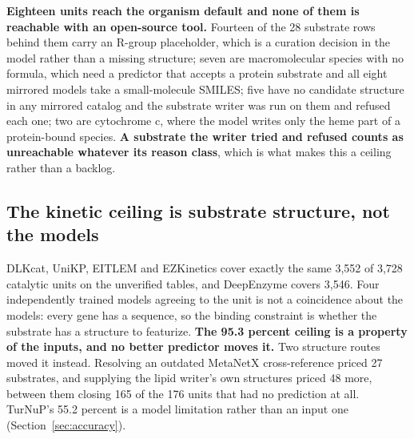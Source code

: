 

\textbf{Eighteen units reach the organism default and none of them is reachable with an
open-source tool.} Fourteen of the 28 substrate rows behind them carry an R-group
placeholder, which is a curation decision in the model rather than a missing structure;
seven are macromolecular species with no formula, which need a predictor that accepts a
protein substrate and all eight mirrored models take a small-molecule SMILES; five have no
candidate structure in any mirrored catalog and the substrate writer was run on them and
refused each one; two are cytochrome c, where the model writes only the heme part of a
protein-bound species. \textbf{A substrate the writer tried and refused counts as
unreachable whatever its reason class}, which is what makes this a ceiling rather than a
backlog.

\subsection{The kinetic ceiling is substrate structure, not the models}

DLKcat, UniKP, EITLEM and EZKinetics cover exactly the same 3{,}552 of 3{,}728 catalytic
units on the unverified tables, and DeepEnzyme covers 3{,}546. Four independently trained
models agreeing to the unit is not a coincidence about the models: every gene has a
sequence, so the binding constraint is whether the substrate has a structure to featurize.
\textbf{The 95.3 percent ceiling is a property of the inputs, and no better predictor moves
it.} Two structure routes moved it instead. Resolving an outdated MetaNetX cross-reference
priced 27 substrates, and supplying the lipid writer's own structures priced 48 more,
between them closing 165 of the 176 units that had no prediction at all. TurNuP's 55.2
percent is a model limitation rather than an input one (Section~\ref{sec:accuracy}).

